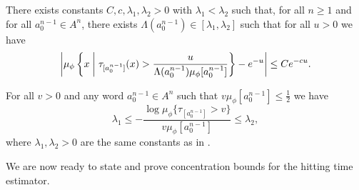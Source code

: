 \begin{lemma}\label{lem:cm-4-2}
	There exists constants $C, c, \lambda_1, \lambda_2 > 0$ with $\lambda_1 < \lambda_2$ such that, for all $n \geq 1$ and for all $a_0^{n - 1} \in A^n$, there exists $\Lambda(a_0^{n - 1}) \in [\lambda_1, \lambda_2]$ such that for all $u > 0$ we have
	\[
		\left| \mu_\phi\left\{x \mathrel{}\middle|\mathrel{} \tau_{[a_0^{n - 1}]}(x) > \frac{u}{\Lambda(a_0^{n - 1}) \mu_\phi[a_0^{n - 1}]}\right\} - e^{-u} \right| \leq Ce^{-cu}.
	\]
\end{lemma}

\begin{lemma}\label{lem:cm-4-3}
	For all $v > 0$ and any word $a_0^{n - 1} \in A^n$ such that $v\mu_\phi[a_0^{n - 1}] \leq \frac{1}{2}$ we have
	\[
		\lambda_1 \leq -\frac{\log{\mu_\phi\{\tau_{[a_0^{n - 1}]} > v\}}}{v\mu_\phi[a_0^{n - 1}]} \leq \lambda_2,
	\]
	where $\lambda_1, \lambda_2 > 0$ are the same constants as in .
\end{lemma}

We are now ready to state and prove concentration bounds for the hitting time estimator.

